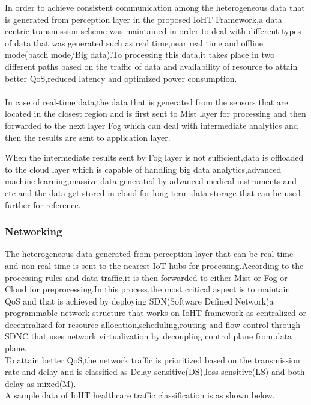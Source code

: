 In order to achieve consistent communication among the heterogeneous data that is generated from perception layer in the proposed IoHT Framework,a data centric transmission scheme was maintained in order to deal with different types of data that was generated such as real time,near real time and offline mode(batch mode/Big data).To processing this data,it takes place in two different paths based on the traffic of data and availability of resource to attain better QoS,reduced latency and optimized power consumption\cite{3}.\\ \\

In case of real-time data,the data that is generated from the sensors that are located in the closest region and is first sent to Mist layer for processing and then forwarded to the next layer Fog which can deal with intermediate analytics and then the results are sent to application layer.

When the intermediate results sent by Fog layer is not sufficient,data is offloaded to the cloud layer which is capable of handling big data analytics,advanced machine learning,massive data generated by advanced medical instruments and etc and the data get stored in cloud for long term data storage that can be used further for reference.\\


\subsubsection{Networking}
The heterogeneous data generated from perception layer that can be real-time and non real time is sent to the nearest IoT hubs for processing.According to the processing rules and data traffic,it is then forwarded to either Mist or Fog or Cloud for preprocessing.In this process,the most critical aspect is to maintain QoS and that is achieved by deploying SDN(Software Defined Network)a programmable network structure that works on IoHT framework as centralized or decentralized for resource allocation,scheduling,routing and flow control through SDNC that uses network virtualization by decoupling control plane from data plane\cite{3}.\\

To attain better QoS,the network traffic is prioritized based on the transmission rate and delay and is classified as Delay-sensitive(DS),loss-sensitive(LS) and both delay as mixed(M)\cite{3}.\\

A sample data of IoHT healthcare traffic classification is as shown below.\\

